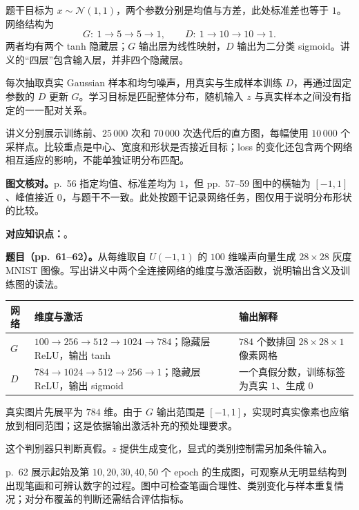 \begin{workedsolution}
\nopagebreak[4]
题干目标为 $x\sim\mathcal N(1,1)$，两个参数分别是均值与方差，此处标准差也等于 $1$。网络结构为
\[
 G:\ 1\to5\to5\to1,\qquad
 D:\ 1\to10\to10\to1.
\]
两者均有两个 tanh 隐藏层；$G$ 输出层为线性映射，$D$ 输出为二分类 sigmoid。讲义的“四层”包含输入层，并非四个隐藏层。

每次抽取真实 Gaussian 样本和均匀噪声，用真实与生成样本训练 $D$，再通过固定参数的 $D$ 更新 $G$。学习目标是匹配整体分布，随机输入 $z$ 与真实样本之间没有指定的一一配对关系。

讲义分别展示训练前、$25\,000$ 次和 $70\,000$ 次迭代后的直方图，每幅使用 $10\,000$ 个采样点。比较重点是中心、宽度和形状是否接近目标；loss 的变化还包含两个网络相互适应的影响，不能单独证明分布匹配。

\textbf{图文核对。}p.~56 指定均值、标准差均为 $1$，但 pp.~57--59 图中的横轴为 $[-1,1]$、峰值接近 $0$，与题干不一致。此处按题干记录网络任务，图仅用于说明分布形状的比较。
\end{workedsolution}


\textbf{对应知识点：}。

\textbf{题目（pp.~61--62）。}从每维取自 $U(-1,1)$ 的 $100$ 维噪声向量生成 $28\times28$ 灰度 MNIST 图像。写出讲义中两个全连接网络的维度与激活函数，说明输出含义及训练图的读法。

\begin{workedsolution}
\begin{center}
\small
\begin{tabularx}{\textwidth}{@{}lXX@{}}
\toprule
网络 & 维度与激活 & 输出解释 \\
\midrule
$G$ & $100\to256\to512\to1024\to784$；隐藏层 ReLU，输出 tanh & $784$ 个数排回 $28\times28\times1$ 像素网格 \\
$D$ & $784\to1024\to512\to256\to1$；隐藏层 ReLU，输出 sigmoid & 一个真假分数，训练标签为真实 $1$、生成 $0$ \\
\bottomrule
\end{tabularx}
\end{center}
真实图片先展平为 $784$ 维。由于 $G$ 输出范围是 $[-1,1]$，实现时真实像素也应缩放到相同范围；这是依据输出激活补充的预处理要求。

这个判别器只判断真假。$z$ 提供生成变化，显式的类别控制需另加条件输入。

p.~62 展示起始及第 $10,20,30,40,50$ 个 epoch 的生成图，可观察从无明显结构到出现笔画和可辨认数字的过程。图中可检查笔画合理性、类别变化与样本重复情况；对分布覆盖的判断还需结合评估指标。
\end{workedsolution}

